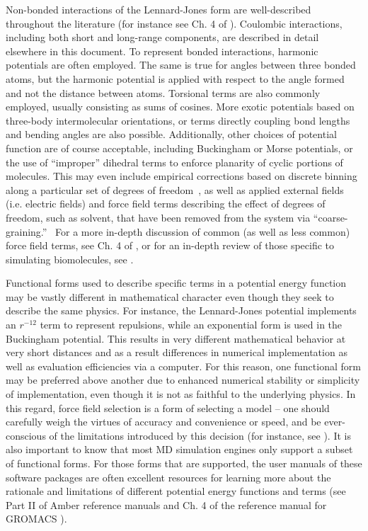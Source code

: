 \documentclass[9pt,bestpractices]{livecoms}
\begin{document}
Non-bonded interactions of the Lennard-Jones form are well-described throughout the literature (for instance see Ch. 4 of \citet{2001Leach}). 
Coulombic interactions, including both short and long-range components, are described in detail elsewhere in this document.
To represent bonded interactions, harmonic potentials are often employed. 
The same is true for angles between three bonded atoms, but the harmonic potential  is applied with respect to the angle formed and not the distance between atoms. 
Torsional terms are also commonly employed, usually consisting as sums of  cosines.
More exotic potentials based on three-body intermolecular  orientations, or terms directly coupling bond lengths and bending angles are also possible. 
Additionally, other choices of potential function are of course  acceptable, including Buckingham or Morse potentials, or the use of ``improper'' dihedral terms to enforce planarity of cyclic portions of molecules. 
This may even include empirical corrections based on discrete binning along a particular set of degrees of freedom~\citep{mackerell2004CMAP, perez2015}, as well as applied external fields (i.e. electric fields) and force field terms describing the effect of degrees of freedom, such as solvent, that have been removed from the system via ``coarse-graining.''~\citep{sanyal2016}
For a more in-depth discussion of common (as well as less common) force field terms, see Ch. 4 of \citet{2001Leach}, or for an in-depth review of those specific to simulating biomolecules, see \citet{Ponder2003}.

Functional forms used to describe specific terms in a potential energy function may be vastly different in mathematical character even though they seek to describe the same physics.
For instance, the Lennard-Jones potential implements an $r^{-12}$ term to represent repulsions, while an exponential form is used in the Buckingham potential.
This results in very different mathematical behavior at very short distances and as a result differences in numerical implementation as well as evaluation efficiencies via a computer.
For this reason, one functional form may be preferred above another due to  enhanced numerical stability or simplicity of implementation, even though it is not as faithful to the underlying physics.
In this regard, force field selection is a form of selecting a model -- one should carefully weigh the virtues of accuracy and convenience or speed, and be ever-conscious of the limitations introduced by this decision (for instance, see \citet{Becker2013}).
It is also important to know that most MD simulation engines only support a subset of functional forms.
For those forms that are supported, the user manuals of these software packages are often excellent resources for learning more about the rationale and limitations of different potential energy functions and terms (see Part II of Amber reference manuals\citep{AmberManual} and Ch. 4 of the reference manual for GROMACS \citep{GROMACSManual}).
\end{document}
